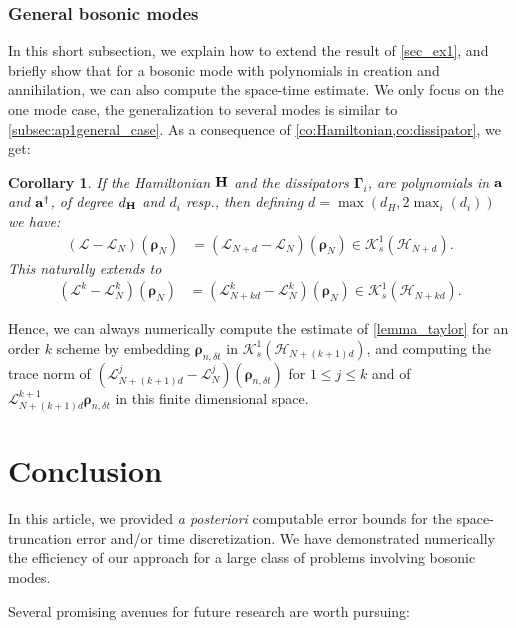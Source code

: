 \documentclass[a4paper,onecolumn,amsmath,amssymb,amsfonts,accepted=2026-03-06]{quantumarticle}
\newcommand{\xH}{\mathcal{H}}
\newcommand{\xK}{\mathcal{K}}
\newcommand{\LL}{{\mathbf{\Gamma}}}
\newcommand{\Hamil}{{\bf H}}
\newcommand{\destroy}{{\bf a}}
\newcommand{\create}{{\bf a^\dag}}
\newtheorem{corollary}{Corollary}
\begin{document}
\subsubsection{General bosonic modes}
In this short subsection, we explain how to extend the result of \cref{sec_ex1}, and briefly show that for a bosonic mode with polynomials in creation and annihilation, we can also compute the space-time estimate. We only focus on the one mode case, the generalization to several modes is similar to \cref{subsec:ap1general_case}.
As a consequence of \cref{co:Hamiltonian,co:dissipator}, we get:
\begin{corollary}
    \label{co:L-LN}
    If the Hamiltonian $\Hamil$ and the dissipators $\LL_i$, are polynomials in $\destroy$ and $\create$, of degree $d_{\Hamil}$ and $d_i$ resp., then defining $d=\max(d_H, 2\max_i(d_i))$ we have:
    \begin{align}
        (\mathcal{L}-\mathcal{L}_N)(\boldsymbol{\rho}_N)&=(\mathcal{L}_{N + d}-\mathcal{L}_N)(\boldsymbol{\rho}_N)\in \xK_s^1(\xH_{N+d}).
    \end{align} 
 This naturally extends to 
    \begin{align}
        (\mathcal{L}^k-\mathcal{L}_N^k)(\boldsymbol{\rho}_N)&=(\mathcal{L}_{N + kd}^k-\mathcal{L}_N^k)(\boldsymbol{\rho}_N) \in \xK_s^1(\xH_{N+kd}).
    \end{align} 
\end{corollary}
Hence, we can always numerically compute the estimate of \cref{lemma_taylor} for an order $k$ scheme by embedding $\boldsymbol{\rho}_{n,\delta t}$ in $\xK_s^1(\xH_{N+(k+1)d})$, and computing the trace norm of $(\mathcal{L}^j_{N + (k+1)d}-\mathcal{L}^j_N)(\boldsymbol{\rho}_{n,\delta t})$ for $1\leq j \leq k$ and of $\mathcal{L}^{k+1}_{N + (k+1)d}\boldsymbol{\rho}_{n,\delta t}$ in this finite dimensional space.


\section{Conclusion}
\label{sec_ccl}
In this article, we provided \textit{a posteriori} computable error bounds for the space-truncation error and/or time discretization. We have demonstrated numerically the efficiency of our approach for a large class of problems involving bosonic modes.

Several promising avenues for future research are worth pursuing:
\end{document}
